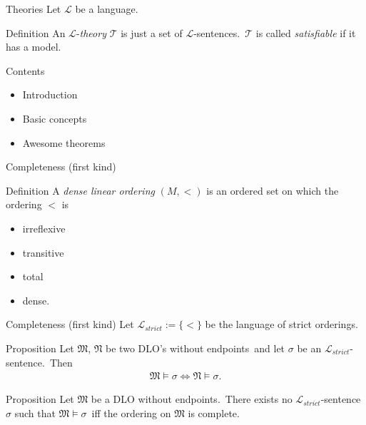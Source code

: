 \documentclass{beamer}
\begin{document}
\begin{frame}{Theories}
Let $\mathcal{L}$ be a language.
\pause

\begin{block}{Definition}
An $\mathcal{L}$-\textit{theory} $\mathcal{T}$ is just a set of $\mathcal{L}$-sentences.\pause\ $\mathcal{T}$ is called \textit{satisfiable} if it has a model.
\end{block}
\end{frame}


\begin{frame}{Contents}
	\begin{itemize}
		\item<0> Introduction
		\item<0> Basic concepts
		\item<1> Awesome theorems
	\end{itemize}
\end{frame}


\begin{frame}{Completeness (first kind)}
	\pause	
	\begin{block}{Definition}
		A \textit{dense linear ordering} $(M,<)$ is an ordered set on which the ordering $<$ is
		\begin{itemize}
			\pause\item irreflexive
			\pause\item transitive
			\pause\item total
			\pause\item dense.
		\end{itemize}
	\end{block}
\end{frame}


\begin{frame}{Completeness (first kind)}	
	Let $\mathcal{L}_{strict}:=\{<\}$ be the language of strict orderings.\\
	
	\pause
	
	\begin{block}{Proposition}
		Let $\mathfrak{M}$, $\mathfrak{N}$ be two DLO's without endpoints\pause\ and let $\sigma$ be an $\mathcal{L}_{strict}$-sentence.\pause\ Then
		\begin{align*}
			\mathfrak{M}\models\sigma\Leftrightarrow\mathfrak{N}\models\sigma.
		\end{align*}
	\end{block}
	
	\pause	
	
	\begin{block}{Proposition}
		Let $\mathfrak{M}$ be a DLO without endpoints.\pause\ There exists no $\mathcal{L}_{strict}$-sentence $\sigma$ such that $\mathfrak{M}\models\sigma$\pause\ iff the ordering on $\mathfrak{M}$ is complete.
	\end{block}
\end{frame}
\end{document}
